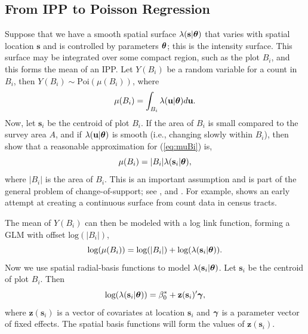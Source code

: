 \documentclass[12pt, titlepage]{article}\usepackage[]{graphicx}\usepackage[]{color}
\newcommand{\bz}{\ensuremath{\mathbf{z}}}
\newcommand{\bs}{\ensuremath{\mathbf{s}}}
\newcommand{\bu}{\ensuremath{\mathbf{u}}}
\def\bs{\mathbf{s}}
\def\bu{\mathbf{u}}
\def\bz{\mathbf{z}}
\def\bgamma{\mbox{\boldmath $\gamma$}}
\def\btheta{\mbox{\boldmath $\theta$}}
\def\log{\textrm{log}}
\def\Poi{\textrm{Poi}}
\begin{document}
\subsection{From IPP to Poisson Regression}\label{sec:IPPtoPoi}

Suppose that we have a smooth spatial surface $\lambda(\bs|\btheta)$ that varies with spatial location $\bs$ and is controlled by parameters $\btheta$; this is the intensity surface.  This surface may be integrated over some compact region, such as the plot $B_i$, and this forms the mean of an IPP.  Let $Y(B_i)$ be a random variable for a count in $B_i$, then $Y(B_i) \sim \Poi(\mu(B_i))$, where
\begin{equation}\label{eq:muBi}
	\mu(B_i) = \int_{B_i}\lambda(\bu|\btheta) d\bu.
\end{equation}
Now, let $\bs_i$ be the centroid of plot $B_i$. If the area of $B_i$ is small compared to the survey area $A$, and if $\lambda(\bu|\btheta)$ is smooth (i.e., changing slowly within $B_i$), then \citet{Berm:Turn:appo:1992} show that a reasonable approximation for (\ref{eq:muBi}) is,
\begin{equation}\label{eq:muBiPoint}
	\mu(B_i) = |{B_i}|\lambda(\bs_i|\btheta),
\end{equation}
where $|{B_i}|$ is the area of $B_i$. This is an important assumption and is part of the general problem of change-of-support; see \citet{Gotw:Youn:comb:2002}, \citet*[][Chapter 6]{Bane:Carl:Gelf:hier:2004} and \citet{Wikl:Berl:comb:2005}.  For example, \citet{Bril:spat:1990, Bril:exan:1994} shows an early attempt at creating a continuous surface from count data in census tracts.  

The mean of $Y(B_i)$ can then be modeled with a log link function, forming a GLM with offset $\log(|B_i|)$,
\[
	\log(\mu(B_i)) = \log(|B_i|) + \log(\lambda(\bs_i|\btheta)).
\]
Now we use spatial radial-basis functions to model $\lambda(\bs_i|\btheta)$. Let $\bs_i$ be the centroid of plot $B_i$.  Then 
\begin{equation}\label{eq:logLambda}
	\log(\lambda(\bs_i|\btheta)) = \beta_0^* + \bz(\bs_i)^\prime\bgamma,
\end{equation}
where $\bz(\bs_i)$ is a vector of covariates at location $\bs_i$ and $\bgamma$ is a parameter vector of fixed effects. The spatial basis functions will form the values of $\bz(\bs_i)$.
\end{document}
